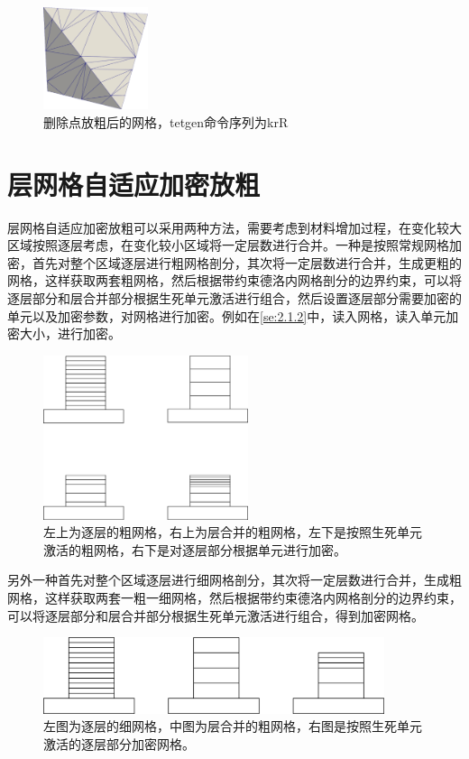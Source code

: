 \begin{figure}[!htbp]
  \centering
  \includegraphics[height=3cm]{fig/2/19.png}
  \caption{删除点放粗后的网格，tetgen命令序列为krR}
  \label{fig:2-1}
\end{figure}


\section{层网格自适应加密放粗}

层网格自适应加密放粗可以采用两种方法，需要考虑到材料增加过程，在变化较大区域按照逐层考虑，在变化较小区域将一定层数进行合并。一种是按照常规网格加密，首先对整个区域逐层进行粗网格剖分，其次将一定层数进行合并，生成更粗的网格，这样获取两套粗网格，然后根据带约束德洛内网格剖分的边界约束，可以将逐层部分和层合并部分根据生死单元激活进行组合，然后设置逐层部分需要加密的单元以及加密参数，对网格进行加密。例如在\ref{se:2.1.2}中，读入网格，读入单元加密大小，进行加密。

\begin{figure}[!htbp]
  \centering
  \includegraphics[width=6cm]{fig/2/20.png}
  \caption{左上为逐层的粗网格，右上为层合并的粗网格，左下是按照生死单元激活的粗网格，右下是对逐层部分根据单元进行加密。}
  \label{fig:2-1}
\end{figure}

另外一种首先对整个区域逐层进行细网格剖分，其次将一定层数进行合并，生成粗网格，这样获取两套一粗一细网格，然后根据带约束德洛内网格剖分的边界约束，可以将逐层部分和层合并部分根据生死单元激活进行组合，得到加密网格。

\begin{figure}[!htbp]
  \centering
  \includegraphics[width=10cm]{fig/2/21.png}
  \caption{左图为逐层的细网格，中图为层合并的粗网格，右图是按照生死单元激活的逐层部分加密网格。}
  \label{fig:2-1}
\end{figure}

